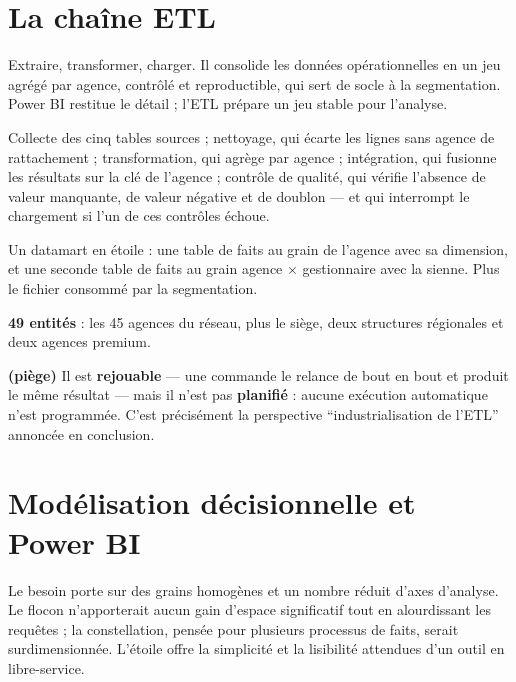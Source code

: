 \documentclass[a4paper,11pt]{article}
\begin{document}
\section{La chaîne ETL}

Extraire, transformer, charger. Il consolide les données opérationnelles en un
jeu agrégé par agence, contrôlé et reproductible, qui sert de socle à la
segmentation. Power BI restitue le détail ; l'ETL prépare un jeu stable pour
l'analyse.

Collecte des cinq tables sources ; nettoyage, qui écarte les lignes sans agence
de rattachement ; transformation, qui agrège par agence ; intégration, qui
fusionne les résultats sur la clé de l'agence ; contrôle de qualité, qui vérifie
l'absence de valeur manquante, de valeur négative et de doublon --- et qui
interrompt le chargement si l'un de ces contrôles échoue.

Un datamart en étoile : une table de faits au grain de l'agence avec sa
dimension, et une seconde table de faits au grain agence $\times$ gestionnaire
avec la sienne. Plus le fichier consommé par la segmentation.

\textbf{49 entités} : les 45 agences du réseau, plus le siège, deux structures
régionales et deux agences premium.

 \textbf{(piège)}
Il est \textbf{rejouable} --- une commande le relance de bout en bout et produit
le même résultat --- mais il n'est pas \textbf{planifié} : aucune exécution
automatique n'est programmée. C'est précisément la perspective
\enquote{industrialisation de l'ETL} annoncée en conclusion.

\section{Modélisation décisionnelle et Power BI}

Le besoin porte sur des grains homogènes et un nombre réduit d'axes d'analyse.
Le flocon n'apporterait aucun gain d'espace significatif tout en alourdissant les
requêtes ; la constellation, pensée pour plusieurs processus de faits, serait
surdimensionnée. L'étoile offre la simplicité et la lisibilité attendues d'un
outil en libre-service.
\end{document}
